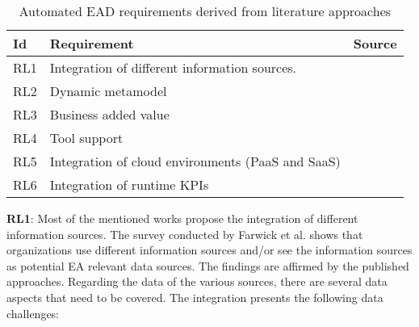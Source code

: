 \begin{table}[htpb]
  \caption[Automated EAD requirements derived from literature approaches]{Automated EAD requirements derived from literature approaches}\label{tab:literaturerequirements}
  \centering
  \begin{tabular}{l l l}
    \toprule
      Id & Requirement & Source\\
    \midrule
      RL1 & Integration of different information sources. &\cite{Farwick2010}\cite{Farwick2015}\cite{Bogner2016}\cite{Johnson2016}\cite{Landthaler2018}\\
      RL2 & Dynamic metamodel &\cite{Hauder2012}\cite{Farwick2013}\cite{Roth2013}\cite{Farwick2010}\cite{Buschle2012}\cite{Holm2014}\cite{Valja2015}\cite{Bogner2016}\\
      RL3 & Business added value &\cite{Hauder2012}\cite{Roth2013}\cite{Farwick2010}\\
      RL4 & Tool support &\cite{Hauder2012}\cite{Roth2013}\cite{Holm2014}\cite{Farwick2015}\\
      RL5 & Integration of cloud environments (PaaS and SaaS) &\cite{Farwick2010}\cite{Farwick2015}\cite{Bogner2016}\\
      RL6 & Integration of runtime KPIs &\cite{Farwick2010}\cite{Farwick2015}\cite{Bogner2016}\\
    \bottomrule
  \end{tabular}
\end{table}


\textbf{RL1}: Most of the mentioned works propose the integration of different information sources. The survey conducted by Farwick et al. \cite{Farwick2013} shows that organizations use different information sources and/or see the information sources as potential EA relevant data sources. The findings are affirmed by the published approaches.
Regarding the data of the various sources, there are several data aspects that need to be covered. The integration presents the following data challenges:

